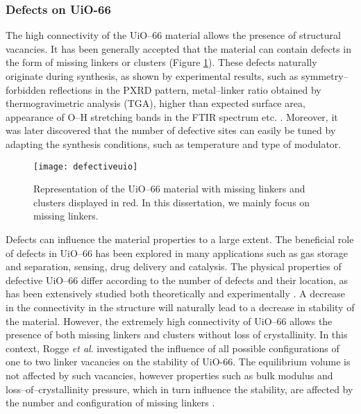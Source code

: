 \subsubsection*{Defects on UiO-66}
The high connectivity of the UiO--66 material allows the presence of structural vacancies. It has been generally accepted that the material can contain defects in the form of missing linkers or clusters (Figure \ref{fig:defectiveuio}). These defects naturally originate during synthesis, as shown by experimental results, such as symmetry--forbidden reflections in the PXRD pattern, metal--linker ratio obtained by thermogravimetric analysis (TGA), higher than expected surface area, appearance of O--H stretching bands in the FTIR spectrum etc. \cite{shearer2014tuned, valenzano2011disclosing}. Moreover, it was later discovered that the number of defective sites can easily be tuned by adapting the synthesis conditions, such as temperature and type of modulator\cite{wu2013unusual, shearer2016defect}.
\begin{figure}[!hbtp]
	\centering
 	\texttt{[image: defectiveuio]}
	\caption{Representation of the UiO--66 material with missing linkers and clusters displayed in red. In this dissertation, we mainly focus on missing linkers.}
	\label{fig:defectiveuio}
\end{figure}
\npar
Defects can influence the material properties to a large extent. The beneficial role of defects in UiO--66 has been explored in many applications such as gas storage and separation\cite{wu2013unusual, ren2014modulated}, sensing\cite{stassen2016towards}, drug delivery\cite{cunha2013rationale} and catalysis\cite{vermoortele2013synthesis, rogge2017metal}. The physical properties of defective UiO--66 differ according to the number of defects and their location, as has been extensively studied both theoretically and experimentally \cite{rogge2016thermodynamic, devos2017missing, cliffe2014correlated, borges2016proton}. A decrease in the connectivity in the structure will naturally lead to a decrease in stability of the material. However, the extremely high connectivity of UiO--66 allows the presence of both missing linkers and clusters without loss of crystallinity. In this context, Rogge \textit{et al}. investigated the influence of all possible configurations of one to two linker vacancies on the stability of UiO-66. The equilibrium volume is not affected by such vacancies, however properties such as bulk modulus and loss--of--crystallinity pressure, which in turn influence the stability, are affected by the number and configuration of missing linkers \cite{rogge2016thermodynamic}. 
